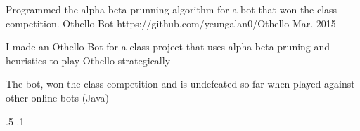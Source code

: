 \begin{cventries}






\vspace{-1.25em}
\myProject
{Programmed the alpha-beta prunning algorithm for a bot that won the class competition.} %
{Othello Bot} %
{https://github.com/yeungalan0/Othello} %
{Mar. 2015} %
{ %
\begin{cvitems}
\item {I made an Othello Bot for a class project that uses alpha beta pruning and heuristics to play Othello strategically}
\item {The bot, won the class competition and is undefeated so far when played against other online bots (Java)}
\end{cvitems}
}
{.5}
{.1}


\end{cventries}
